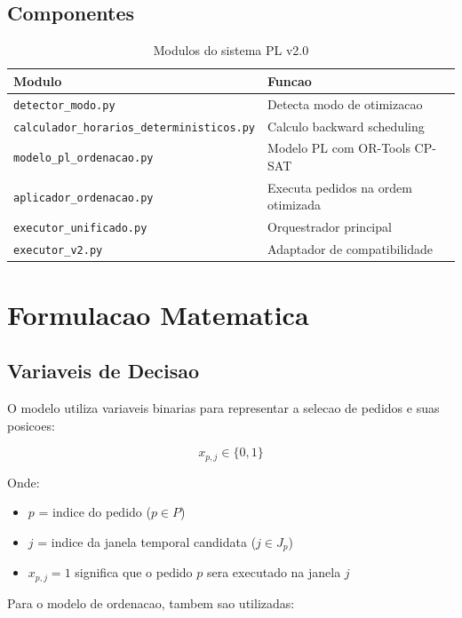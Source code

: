 \documentclass[12pt,a4paper]{article}
\begin{document}
\subsection{Componentes}

\begin{table}[h]
\centering
\begin{tabular}{ll}
\toprule
\textbf{Modulo} & \textbf{Funcao} \\
\midrule
\texttt{detector\_modo.py} & Detecta modo de otimizacao \\
\texttt{calculador\_horarios\_deterministicos.py} & Calculo backward scheduling \\
\texttt{modelo\_pl\_ordenacao.py} & Modelo PL com OR-Tools CP-SAT \\
\texttt{aplicador\_ordenacao.py} & Executa pedidos na ordem otimizada \\
\texttt{executor\_unificado.py} & Orquestrador principal \\
\texttt{executor\_v2.py} & Adaptador de compatibilidade \\
\bottomrule
\end{tabular}
\caption{Modulos do sistema PL v2.0}
\end{table}

\section{Formulacao Matematica}

\subsection{Variaveis de Decisao}

O modelo utiliza variaveis binarias para representar a selecao de pedidos e suas posicoes:

\begin{equation}
x_{p,j} \in \{0, 1\}
\end{equation}

Onde:
\begin{itemize}
    \item $p$ = indice do pedido ($p \in P$)
    \item $j$ = indice da janela temporal candidata ($j \in J_p$)
    \item $x_{p,j} = 1$ significa que o pedido $p$ sera executado na janela $j$
\end{itemize}

Para o modelo de ordenacao, tambem sao utilizadas:
\end{document}
